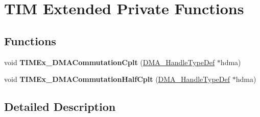 \hypertarget{group___t_i_m_ex___private___functions}{}\section{T\+IM Extended Private Functions}
\label{group___t_i_m_ex___private___functions}
\subsection*{Functions}
\begin{DoxyCompactItemize}
\item 
\mbox{\label{group___t_i_m_ex___private___functions_gaf473fa38254d62a74a006a781fe0aeb8}} 
void {\bfseries T\+I\+M\+Ex\+\_\+\+D\+M\+A\+Commutation\+Cplt} (\hyperlink{group___d_m_a___exported___types_ga41b754a906b86bce54dc79938970138b}{D\+M\+A\+\_\+\+Handle\+Type\+Def} $\ast$hdma)
\item 
\mbox{\label{group___t_i_m_ex___private___functions_ga65b7244a1ee94cf20081543377ba8d2a}} 
void {\bfseries T\+I\+M\+Ex\+\_\+\+D\+M\+A\+Commutation\+Half\+Cplt} (\hyperlink{group___d_m_a___exported___types_ga41b754a906b86bce54dc79938970138b}{D\+M\+A\+\_\+\+Handle\+Type\+Def} $\ast$hdma)
\end{DoxyCompactItemize}


\subsection{Detailed Description}
